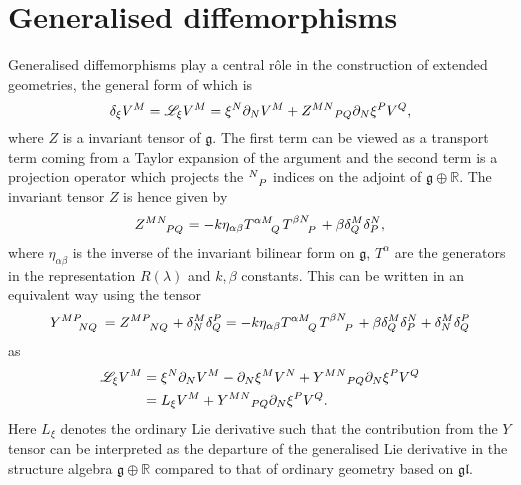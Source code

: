 \section{Generalised diffemorphisms}
Generalised diffemorphisms play a central rôle in the construction of extended geometries, the general form of which is
\begin{equation}
    \delta_\xi V^M = \mathscr{L}_\xi V^M = \xi^N\pd_N V^M+\tensor{Z}{^M^N}_{PQ}\pd_N\xi^PV^Q,
\end{equation}
where $Z$ is a invariant tensor of $\mathfrak{g}$. The first term can be viewed as a transport term coming from a Taylor expansion of the argument and the second term is a projection operator which projects the $\tensor{}{^N_P}$ indices on the adjoint of $\mathfrak{g}\oplus \mathbb{R}$. The invariant tensor $Z$ is hence given by 
\begin{equation}
    \tensor{Z}{^M^N_P_Q} = -k\eta_{\alpha\beta}\tensor{T}{^\alpha^M_Q}\tensor{T}{^\beta^N_P}+\beta\delta^M_Q\delta^N_P,
\end{equation}
where $\eta_{\alpha\beta}$ is the inverse of the invariant bilinear form on $\mathfrak{g}$, $T^{\alpha}$ are the generators in the representation $R(\lambda)$ and $k,\beta$ constants. This can be written in an equivalent way using the tensor
\begin{equation}\label{eq:Y}
    \tensor{Y}{^M^P_N_Q} = \tensor{Z}{^M^P_N_Q}+\delta^M_N\delta^P_Q = -k\eta_{\alpha\beta}\tensor{T}{^\alpha^M_Q}\tensor{T}{^\beta^N_P}+\beta\delta^M_Q\delta^N_P+\delta^M_N\delta^P_Q
\end{equation}
as 
\begin{equation}
    \begin{aligned}
        \mathscr{L}_\xi V^M &= \xi^N\pd_N V^M-\pd_N\xi^MV^N+\tensor{Y}{^M^N}_{PQ}\pd_N\xi^PV^Q\\
        &= L_\xi V^M+\tensor{Y}{^M^N}_{PQ}\pd_N\xi^PV^Q.
    \end{aligned}
\end{equation}
Here $L_\xi$ denotes the ordinary Lie derivative such that the contribution from the $Y$ tensor can be interpreted as the departure of the generalised Lie derivative in the structure algebra $\mathfrak{g}\oplus\mathbb{R}$ compared to that of ordinary geometry based on $\mathfrak{gl}$. 

